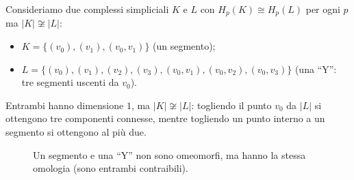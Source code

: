 \begin{ejemplo}[Controesempio]
Consideriamo due complessi simpliciali $K$ e $L$ con $H_p(K) \cong H_p(L)$ per ogni $p$ ma $|K| \not\cong |L|$:
\begin{itemize}
    \item $K = \{ (v_0), (v_1), (v_0, v_1) \}$ (un segmento);
    \item $L = \{ (v_0), (v_1), (v_2), (v_3), (v_0, v_1), (v_0, v_2), (v_0, v_3) \}$ (una ``Y'': tre segmenti uscenti da $v_0$).
\end{itemize}
Entrambi hanno dimensione $1$, ma $|K| \not\cong |L|$: togliendo il punto $v_0$ da $|L|$ si ottengono tre componenti connesse, mentre togliendo un punto interno a un segmento si ottengono al pi\`u due.

\begin{figure}[H]
    \centering
    \caption{Un segmento e una ``Y'' non sono omeomorfi, ma hanno la stessa omologia (sono entrambi contraibili).}
\end{figure}


\end{ejemplo}
